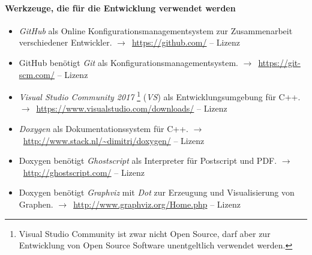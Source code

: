 \documentclass[english,ngerman,parskip=half,headsepline,footsepline]{scrreprt}
\newcounter{Enumi}%
\begin{document}
	\paragraph{Werkzeuge, die für die Entwicklung verwendet werden}
	\begin{itemize}
		\setcounter{enumi}{\value{Enumi}}

		\item\label{Werkzeug:GitHub}\emph{GitHub} als Online Konfigurationsmanagementsystem zur Zusammenarbeit verschiedener Entwickler.
		$\rightarrow$~\url{https://github.com/} -- Lizenz \seename~\cite{bib:GPLii}

		\item\label{Werkzeug:Git}GitHub benötigt \emph{Git} als Konfigurationsmanagementsystem.
		$\rightarrow$~\url{https://git-scm.com/} -- Lizenz \seename~\cite{bib:GPLii}

		\item\label{Werkzeug:VSC}\emph{Visual Studio Community 2017}%
		\footnote{%
			Visual Studio Community ist zwar nicht Open Source, darf aber zur Entwicklung von Open Source Software unentgeltlich verwendet werden.
		}
		(\emph{VS}) als Entwicklungsumgebung für C++.
		$\rightarrow$~\url{https://www.visualstudio.com/downloads/} -- Lizenz \seename~\cite{bib:EULA}

		\item\label{Werkzeug:Doxygen}\emph{Doxygen} als Dokumentationssystem für C++.
		$\rightarrow$~\url{http://www.stack.nl/~dimitri/doxygen/} -- Lizenz \seename~\cite{bib:GPLii}

		\item\label{Werkzeug:Ghostscript}Doxygen benötigt \emph{Ghostscript} als Interpreter für Postscript und PDF.
		$\rightarrow$~\url{http://ghostscript.com/} -- Lizenz \seename~\cite{bib:AGPL}

		\item\label{Werkzeug:Graphviz}Doxygen benötigt \emph{Graphviz} mit \emph{Dot} zur Erzeugung und Visualisierung von Graphen.
		$\rightarrow$~\url{http://www.graphviz.org/Home.php} -- Lizenz \seename~\cite{bib:EPL}

		\setcounter{Enumi}{\value{enumi}}
	\end{itemize}
\end{document}

